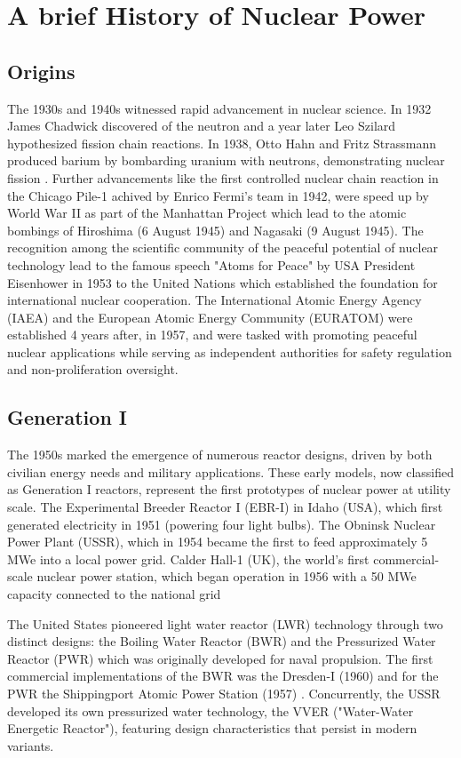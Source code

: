 \section{A brief History of Nuclear Power}
\subsection{Origins}
The 1930s and 1940s witnessed rapid advancement in nuclear science. In 1932 James Chadwick discovered of the neutron \cite{Chadwick_Neutron_1932} and a year later Leo Szilard hypothesized fission chain reactions. In 1938, Otto Hahn and Fritz Strassmann produced barium by bombarding uranium with neutrons, demonstrating nuclear fission \cite{Hahn_Strassmann_1939}. Further advancements like the first controlled nuclear chain reaction in the Chicago Pile-1 achived by Enrico Fermi's team in 1942, were speed up by World War II as part of the Manhattan Project which lead to the atomic bombings of Hiroshima (6 August 1945) and Nagasaki (9 August 1945). The recognition among the scientific community of the peaceful potential of nuclear technology lead to the famous speech "Atoms for Peace" by USA President Eisenhower in 1953 to the United Nations \cite{Eisenhower_Atoms_for_Peace_1953} which established the foundation for international nuclear cooperation. The International Atomic Energy Agency (IAEA) and the European Atomic Energy Community (EURATOM) were established 4 years after, in 1957, and were tasked with promoting peaceful nuclear applications while serving as independent authorities for safety regulation and non-proliferation oversight.

\subsection{Generation I}
The 1950s marked the emergence of numerous reactor designs, driven by both civilian energy needs and military applications. These early models, now classified as Generation I reactors, represent the first prototypes of nuclear power at utility scale. The Experimental Breeder Reactor I (EBR-I) in Idaho (USA), which first generated electricity in 1951 (powering four light bulbs). The Obninsk Nuclear Power Plant (USSR), which in 1954 became the first to feed approximately 5 MWe into a local power grid. Calder Hall-1 (UK), the world's first commercial-scale nuclear power station, which began operation in 1956 with a 50 MWe capacity connected to the national grid

The United States pioneered light water reactor (LWR) technology through two distinct designs: the Boiling Water Reactor (BWR) and the Pressurized Water Reactor (PWR) which was originally developed for naval propulsion. The first commercial implementations of the BWR was the Dresden-I (1960) and for the PWR the Shippingport Atomic Power Station (1957) \cite{IAEA_PRIS_2025}. Concurrently, the USSR developed its own pressurized water technology, the VVER ("Water-Water Energetic Reactor"), featuring design characteristics that persist in modern variants.

